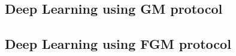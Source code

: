 \subsection{Deep Learning using GM protocol}\label{subsec:deep-learning-using-gm-protocol}

\subsection{Deep Learning using FGM protocol}\label{subsec:deep-learning-using-fgm-protocol}